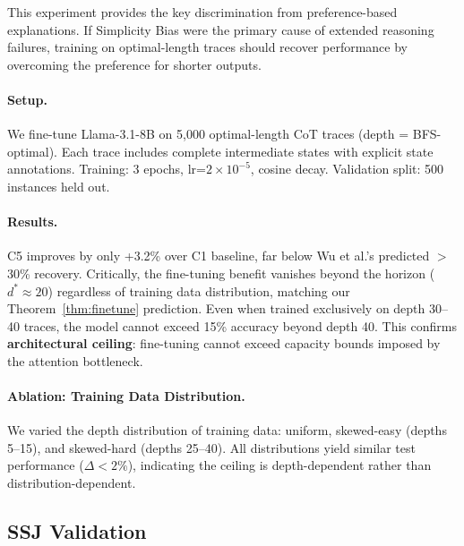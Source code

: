 \documentclass{article}
\theoremstyle{plain}
\theoremstyle{definition}
\theoremstyle{remark}
\begin{document}
This experiment provides the key discrimination from preference-based explanations. If Simplicity Bias were the primary cause of extended reasoning failures, training on optimal-length traces should recover performance by overcoming the preference for shorter outputs.

\paragraph{Setup.} We fine-tune Llama-3.1-8B on 5,000 optimal-length CoT traces (depth = BFS-optimal). Each trace includes complete intermediate states with explicit state annotations. Training: 3 epochs, lr=$2\times10^{-5}$, cosine decay. Validation split: 500 instances held out.

\paragraph{Results.} C5 improves by only +3.2\% over C1 baseline, far below Wu et al.'s predicted $>$30\% recovery. Critically, the fine-tuning benefit vanishes beyond the horizon ($d^*\approx20$) regardless of training data distribution, matching our Theorem~\ref{thm:finetune} prediction. Even when trained exclusively on depth 30--40 traces, the model cannot exceed 15\% accuracy beyond depth 40. This confirms \textbf{architectural ceiling}: fine-tuning cannot exceed capacity bounds imposed by the attention bottleneck.

\paragraph{Ablation: Training Data Distribution.} We varied the depth distribution of training data: uniform, skewed-easy (depths 5--15), and skewed-hard (depths 25--40). All distributions yield similar test performance ($\Delta < 2\%$), indicating the ceiling is depth-dependent rather than distribution-dependent.

\subsection{SSJ Validation}
\label{sec:ssj_validation}
\end{document}

